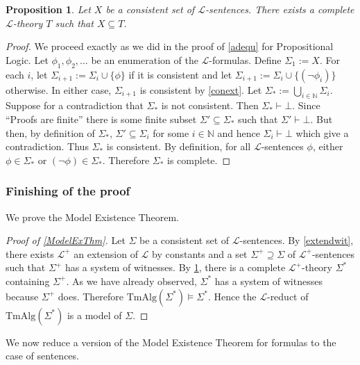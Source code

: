 \documentclass[11pt]{article}
\newcommand{\TmAlg}{\mathrm{TmAlg}}
\newcommand{\proves}{\vdash}
\newtheorem{proposition}[theorem]{Proposition}
\newcommand{\mcal}[1]{\mathcal{#1}}
\newcommand{\N}{\mathbb{N}}
\begin{document}
\begin{proposition}\label{extcomp}
Let $X$ be a consistent set of $\mcal{L}$-sentences. There exists a complete $\mcal{L}$-theory $T$ such that $X\subseteq T$.
\end{proposition}
\begin{proof}
We proceed exactly as we did in the proof of \ref{adequ} for Propositional Logic. Let $\phi_1,\phi_2,\ldots$ be an enumeration of the $\mcal{L}$-formulas. Define $\Sigma_1:=X$. For each $i$, let $\Sigma_{i+1}:=\Sigma_i\cup\{\phi\}$ if it is consistent and let $\Sigma_{i+1}:=\Sigma_i\cup\{(\neg\phi_i)\}$ otherwise. In either case, $\Sigma_{i+1}$ is consistent by \ref{conext}. Let $\Sigma_*:=\bigcup_{i\in\N}\Sigma_i$. Suppose for a contradiction that $\Sigma_*$ is not consistent. Then $\Sigma_*\proves \bot$. Since ``Proofs are finite'' there is some finite subset $\Sigma'\subseteq \Sigma_*$ such that $\Sigma'\proves \bot$. But then, by definition of $\Sigma_*$, $\Sigma'\subseteq \Sigma_i$ for some $i\in\N$ and hence $\Sigma_i\proves \bot$ which give a contradiction. Thus $\Sigma_*$ is consistent.
By definition, for all $\mcal{L}$-sentences $\phi$, either $\phi\in \Sigma_*$ or $(\neg\phi)\in \Sigma_*$. Therefore $\Sigma_*$ is complete.
\end{proof}


\subsubsection*{Finishing of the proof}

We prove the Model Existence Theorem.

\begin{proof}[Proof of \ref{ModelExThm}]
Let $\Sigma$ be a consistent set of $\mcal{L}$-sentences. By \ref{extendwit}, there exists $\mcal{L}^+$ an extension of $\mcal{L}$ by constants and a set $\Sigma^+\supseteq \Sigma$ of $\mcal{L}^+$-sentences such that $\Sigma^+$ has a system of witnesses. By \ref{extcomp}, there is a complete $\mcal{L}^+$-theory $\Sigma^*$ containing $\Sigma^+$. As we have already observed, $\Sigma^*$ has a system of witnesses because $\Sigma^+$ does. Therefore $\TmAlg(\Sigma^*)\models \Sigma^*$. Hence the $\mcal{L}$-reduct of $\TmAlg(\Sigma^*)$ is a model of $\Sigma$.
\end{proof}

We now reduce a version of the Model Existence Theorem for formulas to the case of sentences.
\end{document}
